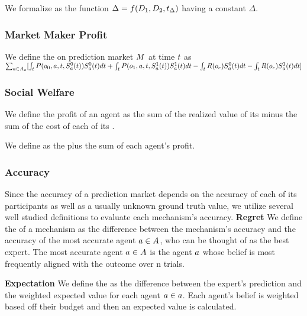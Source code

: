 We formalize  as the function $\Delta = f(D_{1},D_{2},t_{\Delta})$
having a constant $\Delta$.\\

\subsubsection{Market Maker Profit}
We define the  on prediction market $M$ at time $t$ as\\
$\sum_{a\in A_o} [
\int_{t} 
P(o_0,a,t, S^{0}_{a}(t))S^{0}_{a}(t)dt
+\int_{t} 
P(o_1,a,t, S^{1}_{a}(t))S^{1}_{a}(t)dt
-\int_{t} 
R(o_e)S^{0}_{a}(t)dt
-\int_{t}
R(o_e)S^{1}_{a}(t)dt]$

\subsubsection{Social Welfare}
We define the profit of an agent as the sum of the realized value of its  minus the
sum of the cost of each of its .

We define  as the  plus the sum of each agent's profit.

\subsubsection{Accuracy}
Since the accuracy of a prediction market depends on the accuracy of each of its participants
as well as a usually unknown ground truth value, we utilize several well studied definitions
to evaluate each mechanism's accuracy.
\textbf{Regret}
We define the  of a mechanism as the difference between the mechanism's accuracy
and the accuracy of the most accurate agent $a\in A$, who can be thought of as the
best expert. The most accurate agent $a\in A$ is the agent $a$ whose belief is
most frequently aligned with the outcome over n trials.

\textbf{Expectation}
We define the  as the difference between the expert's prediction
and the weighted expected value for each agent $a\in a$. Each agent's belief is weighted
based off their budget and then an expected value is calculated.

